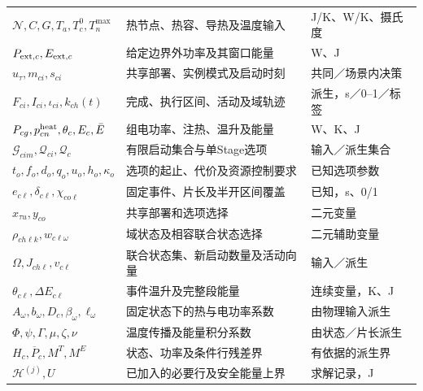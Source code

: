 \begin{longtable}{@{}p{5.1cm}p{6.1cm}>{\raggedright\arraybackslash}p{2.8cm}@{}}
\(\mathcal N,C,G,T_a,T_c^0,T_n^{\max}\) & 热节点、热容、导热及温度输入 & J/K、W/K、摄氏度 \\
\(P_{{\rm ext},c},E_{{\rm ext},c}\) & 给定边界外功率及其窗口能量 & W、J \\
\midrule
\(u_\tau,m_{ci},s_{ci}\) & 共享部署、实例模式及启动时刻 & 共同／场景内决策 \\
\(F_{ci},I_{ci},\iota_{ci},k_{ch}(t)\) & 完成、执行区间、活动及域轨迹 & 派生，s／0--1／标签 \\
\(P_{cg},p^{\rm heat}_{cn},\theta_c,E_c,\bar E\) & 组电功率、注热、温升及能量 & W、K、J \\
\midrule
\(\mathcal G_{cim},\mathcal Q_{ci},\mathcal Q_c\) & 有限启动集合与单Stage选项 & 输入／派生集合 \\
\(t_o,f_o,d_o,q_o,u_o,h_o,\kappa_o\) & 选项的起止、代价及资源控制要求 & 已知选项参数 \\
\(e_{c\ell},\delta_{c\ell},\chi_{co\ell}\) & 固定事件、片长及半开区间覆盖 & 已知，s、0/1 \\
\(x_{\tau u},y_{co}\) & 共享部署和选项选择 & 二元变量 \\
\(\rho_{ch\ell k},w_{c\ell\omega}\) & 域状态及相容联合状态选择 & 二元辅助变量 \\
\(\Omega,J_{ch\ell},v_{c\ell}\) & 联合状态集、新启动数量及活动向量 & 输入／派生 \\
\(\theta_{c\ell},\Delta E_{c\ell}\) & 事件温升及完整段能量 & 连续变量，K、J \\
\(A_\omega,b_\omega,D_c,\beta_\omega,\ell_\omega\) & 固定状态下的热与电功率系数 & 由物理输入派生 \\
\(\Phi,\psi,\Gamma,\mu,\zeta,\nu\) & 温度传播及能量积分系数 & 由状态／片长派生 \\
\(H_c,\overline P_c,M^T,M^E\) & 状态、功率及条件行残差界 & 有依据的派生界 \\
\(\mathcal H^{(j)},U\) & 已加入的必要行及安全能量上界 & 求解记录，J \\
\bottomrule
\end{longtable}
